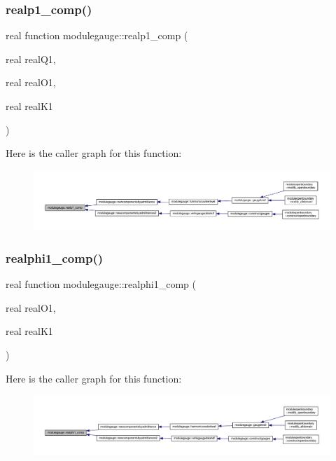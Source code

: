 \subsubsection{\texorpdfstring{realp1\+\_\+comp()}{realp1\_comp()}}
{\footnotesize\ttfamily real function modulegauge\+::realp1\+\_\+comp (\begin{DoxyParamCaption}\item[{real}]{real\+Q1,  }\item[{real}]{real\+O1,  }\item[{real}]{real\+K1 }\end{DoxyParamCaption})\hspace{0.3cm}{\ttfamily [private]}}

Here is the caller graph for this function\+:\nopagebreak
\begin{figure}[H]
\begin{center}
\leavevmode
\includegraphics[width=350pt]{namespacemodulegauge_a063b6192aa0376262853a2161d0f21da_icgraph}
\end{center}
\end{figure}
\mbox{\label{namespacemodulegauge_aa6ea15f43448899f9b29ff0b1dfc29db}} 
\subsubsection{\texorpdfstring{realphi1\+\_\+comp()}{realphi1\_comp()}}
{\footnotesize\ttfamily real function modulegauge\+::realphi1\+\_\+comp (\begin{DoxyParamCaption}\item[{real}]{real\+O1,  }\item[{real}]{real\+K1 }\end{DoxyParamCaption})\hspace{0.3cm}{\ttfamily [private]}}

Here is the caller graph for this function\+:\nopagebreak
\begin{figure}[H]
\begin{center}
\leavevmode
\includegraphics[width=350pt]{namespacemodulegauge_aa6ea15f43448899f9b29ff0b1dfc29db_icgraph}
\end{center}
\end{figure}
\mbox{\label{namespacemodulegauge_a09dbdb08ae03c360a014f9a99d18930d}} 
